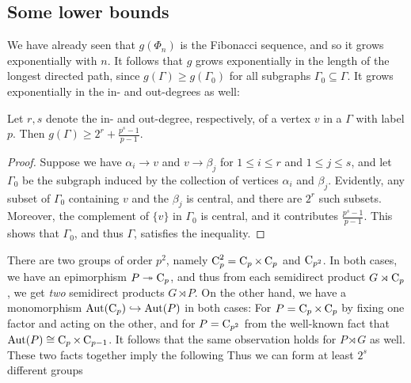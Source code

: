 \subsection{Some lower bounds}
We have already seen that $g(\Phi_n)$ is the Fibonacci sequence, and so it grows exponentially with $n$.
It follows that $g$ grows exponentially in the length of the longest directed path, since $g(\Gamma) \ge  g(\Gamma_0)$ for all subgraphs $\Gamma_0 \subseteq \Gamma$.
It grows exponentially in the in- and out-degrees as well:
\begin{lem}
	Let $r, s$ denote the in- and out-degree, respectively, of a vertex $v$ in a  $\Gamma$ with label $p$.
Then $g(\Gamma) \ge 2^r + \frac{p^s - 1}{p - 1}$.
\end{lem}
\begin{proof}
	Suppose we have $\alpha_i \rightarrow v$ and $v \rightarrow \beta_j$ for $1 \le i \le r$ and $1 \le j \le s$, and let $\Gamma_0$ be the subgraph induced by the collection of vertices $\alpha_i$ and $\beta_j$.
Evidently, any subset of $\Gamma_0$ containing $v$ and the $\beta_j$ is central, and there are $2^r$ such subsets.
Moreover, the complement of $\{v\}$ in $\Gamma_0$ is central, and it contributes $\frac{p^s - 1}{p - 1}$.
This shows that $\Gamma_0$, and thus $\Gamma$, satisfies the inequality.
\end{proof}	
There are two groups of order $p^2$, namely $\operatorname{C}_{p}^2 = \operatorname{C}_{p} \times \operatorname{C}_{p}$ and $\operatorname{C}_{p^2}$.
In both cases, we have an epimorphism $P \twoheadrightarrow \operatorname{C}_{p}$, and thus from each semidirect product $G \rtimes \operatorname{C}_{p}$, we get \textit{two} semidirect products $G \rtimes P$.
On the other hand, we have a monomorphism $\operatorname{Aut}(\operatorname{C}_{p}) \hookrightarrow \operatorname{Aut}(P)$ in both cases: For $P = \operatorname{C}_{p} \times \operatorname{C}_{p}$ by fixing one factor and acting on the other, and for $P = \operatorname{C}_{p^2}$ from the well-known fact that $\operatorname{Aut}(P) \cong \operatorname{C}_{p} \times \operatorname{C}_{p - 1}$.
It follows that the same observation holds for $P \rtimes G$ as well.
These two facts together imply the following
Thus we can form at least $2^s$ different groups 
